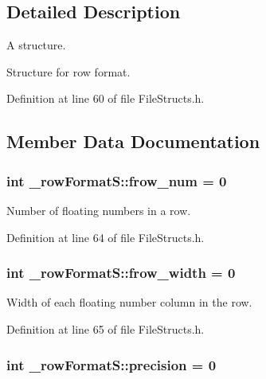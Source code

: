 \subsection{Detailed Description}
A structure. 

Structure for row format. 

Definition at line 60 of file File\+Structs.\+h.



\subsection{Member Data Documentation}
\subsubsection[{\texorpdfstring{frow\+\_\+num}{frow_num}}]{\setlength{\rightskip}{0pt plus 5cm}int \+\_\+row\+Format\+S\+::frow\+\_\+num = 0}\hypertarget{struct__row_format_s_a5a9d061cbfd29e54026f22a6577b1c51}{}\label{struct__row_format_s_a5a9d061cbfd29e54026f22a6577b1c51}


Number of floating numbers in a row. 



Definition at line 64 of file File\+Structs.\+h.

\subsubsection[{\texorpdfstring{frow\+\_\+width}{frow_width}}]{\setlength{\rightskip}{0pt plus 5cm}int \+\_\+row\+Format\+S\+::frow\+\_\+width = 0}\hypertarget{struct__row_format_s_ad8290b8370984dfd0fe1d47329415e57}{}\label{struct__row_format_s_ad8290b8370984dfd0fe1d47329415e57}


Width of each floating number column in the row. 



Definition at line 65 of file File\+Structs.\+h.

\subsubsection[{\texorpdfstring{precision}{precision}}]{\setlength{\rightskip}{0pt plus 5cm}int \+\_\+row\+Format\+S\+::precision = 0}\hypertarget{struct__row_format_s_afd1ddfa4acdc5ea24e031d38ec6dbc77}{}\label{struct__row_format_s_afd1ddfa4acdc5ea24e031d38ec6dbc77}



